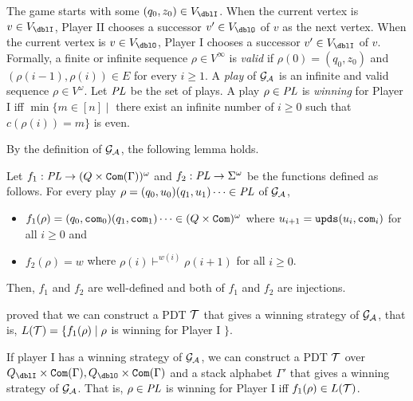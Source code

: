 The game starts with some $(q_0,z_0)\in V_\dblI$.
When the current vertex is $v\in V_\dblI$,
Player II chooses a successor $v'\in V_\dblO$ of $v$ as the next vertex.
When the current vertex is $v\in V_\dblO$,
Player I chooses a successor $v'\in V_\dblI$ of $v$.
Formally, a finite or infinite sequence $\rho\in V^\infty$ is
\emph{valid} if
$\rho(0)=(q_0,z_0)$ and
$(\rho(i-1), \rho(i))\in E$ for every $i\geq 1$.
A \emph{play} of ${\cal G}_{\cal A}$ is an infinite and valid sequence $\rho\in V^\omega$.
Let $\mathit{PL}$ be the set of plays.
A play $\rho\in \mathit{PL}$ is \emph{winning} for Player I iff
$\min\{m\in[n] \mid $ there exist an infinite
number of $i\geq 0$ such that $c(\rho(i)) = m\}$ is even.

By the definition of ${\cal G}_{\cal A}$,
the following lemma holds.
\begin{lemma}
\label{lem: cor}
Let $f_1: \mathit{PL}\to(Q\times\mathtt{Com}(\Gamma))^\omega$ and
$f_2: \mathit{PL}\to\Sigma^\omega$ be the functions defined as follows.
For every play
$\rho=(q_0,u_0)(q_1,u_1)\cdots\in \mathit{PL}$ of ${\cal G}_{\cal A}$,
\begin{itemize}
\item $f_1(\rho)=(q_0,\mathtt{com}_0)(q_1,\mathtt{com}_1)\cdots\in (Q\times\mathtt{Com})^\omega$ where
$u_{i+1} = \mathtt{upds}(u_{i},\mathtt{com}_i)$
for all $i\geq 0$ and
\item $f_2(\rho)=w$ where $\rho(i)\vdash^{w(i)} \rho(i+1)$
for all $i\geq 0$.
\end{itemize}
Then, $f_1$ and $f_2$ are well-defined and both of $f_1$ and $f_2$ are injections.
\end{lemma}
\cite{Wa96} proved that
we can construct a PDT ${\cal T}$
that gives a winning strategy of ${\cal G}_{\cal A}$,
that is, $L({\cal T}) = \{ f_1(\rho) \mid
\rho$ is winning for Player I $\}$.
\begin{theorem}{\cite{Wa96}}
\label{the: wal}
If player I has a winning strategy of ${\cal G}_{\cal A}$,
we can construct a PDT ${\cal T}$ over $Q_\dblI\times\Com(\Gamma), Q_\dblO\times\Com(\Gamma)$ and a stack alphabet $\Gamma'$ that gives a winning strategy of ${\cal G}_{\cal A}$.
That is, $\rho\in \mathit{PL}$ is winning for Player I iff $f_1(\rho)\in L({\cal T})$.
\end{theorem}

